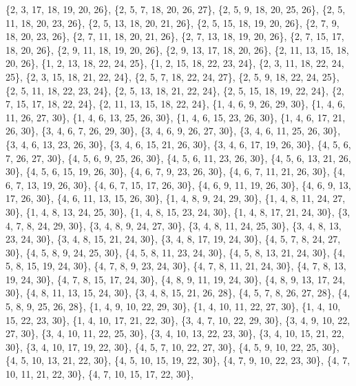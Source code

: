 \documentclass[11pt,a4paper]{article}
\begin{document}
{\{2, 3, 17, 18, 19, 20, 26\}, \{2, 5, 7, 18, 20, 26, 27\}, \{2, 5, 9, 18, 20, 25, 26\}, \{2, 5, 11, 18, 20, 23, 26\}, \{2, 5, 13, 18, 20, 21, 26\},
\{2, 5, 15, 18, 19, 20, 26\}, \{2, 7, 9, 18, 20, 23, 26\}, \{2, 7, 11, 18, 20, 21, 26\}, \{2, 7, 13, 18, 19, 20, 26\}, \{2, 7, 15, 17, 18, 20, 26\},
\{2, 9, 11, 18, 19, 20, 26\}, \{2, 9, 13, 17, 18, 20, 26\}, \{2, 11, 13, 15, 18, 20, 26\}, \{1, 2, 13, 18, 22, 24, 25\}, \{1, 2, 15, 18, 22, 23, 24\},
\{2, 3, 11, 18, 22, 24, 25\}, \{2, 3, 15, 18, 21, 22, 24\}, \{2, 5, 7, 18, 22, 24, 27\}, \{2, 5, 9, 18, 22, 24, 25\}, \{2, 5, 11, 18, 22, 23, 24\},
\{2, 5, 13, 18, 21, 22, 24\}, \{2, 5, 15, 18, 19, 22, 24\}, \{2, 7, 15, 17, 18, 22, 24\}, \{2, 11, 13, 15, 18, 22, 24\}, \{1, 4, 6, 9, 26, 29, 30\},
\{1, 4, 6, 11, 26, 27, 30\}, \{1, 4, 6, 13, 25, 26, 30\}, \{1, 4, 6, 15, 23, 26, 30\}, \{1, 4, 6, 17, 21, 26, 30\}, \{3, 4, 6, 7, 26, 29, 30\},
\{3, 4, 6, 9, 26, 27, 30\}, \{3, 4, 6, 11, 25, 26, 30\}, \{3, 4, 6, 13, 23, 26, 30\}, \{3, 4, 6, 15, 21, 26, 30\}, \{3, 4, 6, 17, 19, 26, 30\},
\{4, 5, 6, 7, 26, 27, 30\}, \{4, 5, 6, 9, 25, 26, 30\}, \{4, 5, 6, 11, 23, 26, 30\}, \{4, 5, 6, 13, 21, 26, 30\}, \{4, 5, 6, 15, 19, 26, 30\},
\{4, 6, 7, 9, 23, 26, 30\}, \{4, 6, 7, 11, 21, 26, 30\}, \{4, 6, 7, 13, 19, 26, 30\}, \{4, 6, 7, 15, 17, 26, 30\}, \{4, 6, 9, 11, 19, 26, 30\},
\{4, 6, 9, 13, 17, 26, 30\}, \{4, 6, 11, 13, 15, 26, 30\}, \{1, 4, 8, 9, 24, 29, 30\}, \{1, 4, 8, 11, 24, 27, 30\}, \{1, 4, 8, 13, 24, 25, 30\},
\{1, 4, 8, 15, 23, 24, 30\}, \{1, 4, 8, 17, 21, 24, 30\}, \{3, 4, 7, 8, 24, 29, 30\}, \{3, 4, 8, 9, 24, 27, 30\}, \{3, 4, 8, 11, 24, 25, 30\},
\{3, 4, 8, 13, 23, 24, 30\}, \{3, 4, 8, 15, 21, 24, 30\}, \{3, 4, 8, 17, 19, 24, 30\}, \{4, 5, 7, 8, 24, 27, 30\}, \{4, 5, 8, 9, 24, 25, 30\},
\{4, 5, 8, 11, 23, 24, 30\}, \{4, 5, 8, 13, 21, 24, 30\}, \{4, 5, 8, 15, 19, 24, 30\}, \{4, 7, 8, 9, 23, 24, 30\}, \{4, 7, 8, 11, 21, 24, 30\},
\{4, 7, 8, 13, 19, 24, 30\}, \{4, 7, 8, 15, 17, 24, 30\}, \{4, 8, 9, 11, 19, 24, 30\}, \{4, 8, 9, 13, 17, 24, 30\}, \{4, 8, 11, 13, 15, 24, 30\},
\{3, 4, 8, 15, 21, 26, 28\}, \{4, 5, 7, 8, 26, 27, 28\}, \{4, 5, 8, 9, 25, 26, 28\}, \{1, 4, 9, 10, 22, 29, 30\}, \{1, 4, 10, 11, 22, 27, 30\},
\{1, 4, 10, 15, 22, 23, 30\}, \{1, 4, 10, 17, 21, 22, 30\}, \{3, 4, 7, 10, 22, 29, 30\}, \{3, 4, 9, 10, 22, 27, 30\}, \{3, 4, 10, 11, 22, 25, 30\},
\{3, 4, 10, 13, 22, 23, 30\}, \{3, 4, 10, 15, 21, 22, 30\}, \{3, 4, 10, 17, 19, 22, 30\}, \{4, 5, 7, 10, 22, 27, 30\}, \{4, 5, 9, 10, 22, 25, 30\},
\{4, 5, 10, 13, 21, 22, 30\}, \{4, 5, 10, 15, 19, 22, 30\}, \{4, 7, 9, 10, 22, 23, 30\}, \{4, 7, 10, 11, 21, 22, 30\}, \{4, 7, 10, 15, 17, 22, 30\},
}
\end{document}
